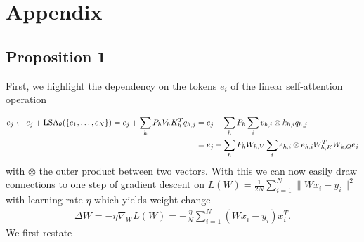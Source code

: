 \documentclass{article}
\theoremstyle{plain}
\theoremstyle{definition}
\theoremstyle{remark}
\begin{document}
\newpage
\appendix
\onecolumn
\section{Appendix}
\label{app:main}
\subsection{Proposition 1}
\label{app:prop1}
First, we highlight the dependency on the tokens $e_i$ of the linear self-attention operation 

\begin{align}
e_j  \leftarrow e_j + \text{LSA}_{\theta}(\{e_1,\ldots,e_N\}) = e_j + \sum_{h} P_hV_hK_h^{T}q_{h,j} &= e_j + \sum_{h} P_h \sum_{i}  v_{h,i} \otimes k_{h,i}q_{h,j} \nonumber\\
\label{eq:lin_trans}
&= e_j + \sum_{h} P_h W_{h,V}\sum_{i} e_{h,i} \otimes e_{h,i} W_{h,K}^T W_{h,Q}e_{j}
\end{align}
with $\otimes$ the outer product between two vectors. With this we can now easily draw connections to one step of gradient descent on $L(W) = \frac{1}{2N}\sum_{i=1}^{N} \|Wx_i - y_i\|^2$ with learning rate $\eta$ which yields weight change
\begin{align}
    \Delta W = - \eta \nabla_W L(W) = - \frac{\eta}{N} \sum_{i=1}^{N}(Wx_i - y_i)x_i^T.
\end{align}
We first restate
\end{document}
